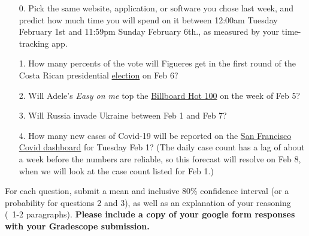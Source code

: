 \documentclass[11pt]{article}
\begin{document}
\begin{enumerate}
	\item[0.] Pick the same website, application, or software you chose last week, and predict how much time you will spend on it between 12:00am Tuesday February 1st and 11:59pm Sunday February 6th., as measured by your time-tracking app.
	
	\item[1.] How many percents of the vote will Figueres get in the first round of the Costa Rican presidential \href{https://en.wikipedia.org/wiki/2022_Costa_Rican_general_election}{election} on Feb 6?
	
	\item[2.] Will Adele's \textit{Easy on me} top the \href{https://www.billboard.com/charts/hot-100/}{Billboard Hot 100} on the week of Feb 5?
 
	\item[3.] Will Russia invade Ukraine between Feb 1 and Feb 7?
	
	\item[4.] How many new cases of Covid-19 will be reported on the \href{https://sf.gov/data/covid-19-cases-and-deaths}{San Francisco Covid dashboard} for Tuesday Feb 1? (The daily case count has a lag of about a week before the numbers are reliable, so this forecast will resolve on Feb 8, when we will look at the case count listed for Feb 1.) 
	
	
\end{enumerate}

For each question, submit a mean and inclusive 80\% confidence interval (or a probability for questions 2 and 3), as well as an explanation of your reasoning (~1-2 paragraphs). \textbf{Please include a copy of your google form responses with your Gradescope submission.}
\end{document}
